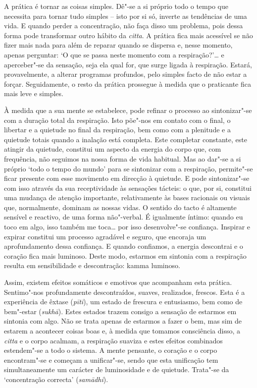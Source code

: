 A prática é tornar as coisas simples. Dê"-se a si próprio todo o tempo que
necessita para tornar tudo simples -- isto por si só, inverte as tendências de
uma vida. E quando perder a concentração, não faça disso um problema, pois dessa
forma pode transformar outro hábito da \emph{citta}. A prática fica mais
acessível se não fizer mais nada para além de reparar quando se dispersa e,
nesse momento, apenas perguntar: `O que se passa neste momento com a
respiração?'\ldots{} e aperceber"-se da sensação, seja ela qual for, que surge ligada
à respiração. Estará, provavelmente, a alterar programas profundos, pelo simples
facto de não estar a forçar. Seguidamente, o resto da prática prossegue à medida
que o praticante fica mais leve e simples.

À medida que a sua mente se estabelece, pode refinar o processo ao sintonizar"-se
com a duração total da respiração. Isto põe"-nos em contato com o final, o
libertar e a quietude no final da respiração, bem como com a plenitude e a
quietude totais quando a inalação está completa. Este completar constante, este
atingir da quietude, constitui um aspecto da energia do corpo que, com
frequência, não seguimos na nossa forma de vida habitual. Mas ao dar"-se a si
próprio `todo o tempo do mundo' para se sintonizar com a respiração, permite"-se
ficar presente com esse movimento em direcção à quietude. E pode sintonizar"-se
com isso através da sua receptividade às sensações tácteis: o que, por si,
constitui uma mudança de atenção importante, relativamente às bases racionais ou
visuais que, normalmente, dominam as nossas vidas. O sentido do tacto é
altamente sensível e reactivo, de uma forma não"-verbal. É igualmente íntimo:
quando eu toco em algo, isso também me toca\ldots{} por isso desenvolve"-se confiança.
Inspirar e expirar constitui um processo agradável e seguro, que encoraja um
aprofundamento dessa confiança. E quando confiamos, a energia descontrai e o
coração fica mais luminoso. Deste modo, estarmos em sintonia com a respiração
resulta em sensibilidade e descontração: kamma luminoso.

Assim, existem efeitos somáticos e emotivos que acompanham esta prática.
Sentimo"-nos profundamente descontraídos, suaves, realizados, frescos. Esta é a
experiência de êxtase (\emph{pīti}), um estado de frescura e entusiasmo, bem
como de bem"-estar (\emph{sukhā}). Estes estados trazem consigo a sensação de
estarmos em sintonia com algo. Não se trata apenas de estarmos a fazer o bem,
mas sim de estarem a acontecer coisas boas e, à medida que tomamos consciência
disso, a \emph{citta} e o corpo acalmam, a respiração suaviza e estes efeitos
combinados estendem"-se a todo o sistema. A mente pensante, o coração e o corpo
encontram"-se e começam a unificar"-se, sendo que esta unificação tem
simultaneamente um carácter de luminosidade e de quietude. Trata"-se da
`concentração correcta' (\emph{samādhi}).

